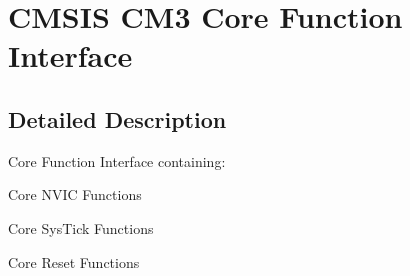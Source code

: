 \hypertarget{group___c_m_s_i_s___c_m3___core___function_interface}{}\section{C\+M\+S\+IS C\+M3 Core Function Interface}
\label{group___c_m_s_i_s___c_m3___core___function_interface}


\subsection{Detailed Description}
Core Function Interface containing\+:
\begin{DoxyItemize}
\item Core N\+V\+IC Functions
\item Core Sys\+Tick Functions
\item Core Reset Functions 
\end{DoxyItemize}